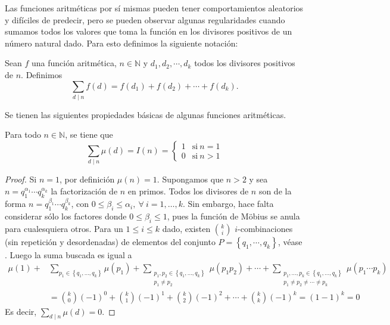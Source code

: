 Las funciones aritméticas por sí mismas pueden tener comportamientos aleatorios y difíciles de predecir, pero se pueden observar algunas regularidades cuando sumamos todos los valores que toma la función en los divisores positivos de un número natural dado. Para esto definimos la siguiente notación:

\begin{definition}
Sean $f$ una función aritmética, $n\in\mathbb{N}$ y $d_1,d_2,\cdots,d_k$ todos los divisores positivos de $n$. Definimos 
\begin{equation*}
	\sum_{d \mid n} f(d)=f(d_1)+f(d_2)+\cdots+f(d_k).
\end{equation*}
\end{definition}

Se tienen las siguientes propiedades básicas de algunas funciones aritméticas.

\begin{proposition}
Para todo $n\in\mathbb{N}$, se tiene que 
\begin{equation*}
	\sum_{d \mid n} \mu(d) = I(n) =
		\begin{cases}
			1 & \text{si} \: n=1 \\ %
			0 & \text{si} \: n>1
		\end{cases}
\end{equation*}
\end{proposition}
\begin{proof}
Si $n=1$, por definición $\mu(n)=1$. Supongamos que $n>2$ y sea $n=q_1^{\alpha_1}\cdots q_k^{\alpha_k}$ la factorización de $n$ en primos. Todos los divisores de $n$ son de la forma $n=q_1^{\beta_1}\cdots q_k^{\beta_k}$, con $0\leq \beta_i\leq \alpha_i,\:\forall \: i=1,\ldots,k$. Sin embargo, hace falta considerar sólo los factores donde $0\leq \beta_i\leq 1$, pues la función de Möbius se anula para cualesquiera otros. Para un $1\leq i\leq k$ dado, existen $\binom{k}{i}$ $i$-combinaciones (sin repetición y desordenadas) de elementos del conjunto $P=\left\{q_1,\cdots,q_k\right\}$, véase \cite{Br1-1999}. Luego la suma buscada es igual a
\begin{align*}
    \mu(1)+&\sum_{p_1\in\left\{q_1,\ldots,q_k\right\}} \mu(p_1) + \sum_{\substack{p_1,p_2\in \left\{q_1,\ldots,q_k\right\} \\ p_1\neq p_2}} \mu(p_1 p_2)+\cdots+\sum_{\substack{p_1,\ldots,p_k\in \left\{q_1,\ldots,q_k\right\} \\ p_1\neq p_2 \neq \cdots \neq p_k}} \mu(p_1\cdots p_k) \\
						   &= \binom{k}{0}(-1)^0+\binom{k}{1}(-1)^1+\binom{k}{2}(-1)^2+\cdots+\binom{k}{k}(-1)^k =  (1-1)^k=0
\end{align*}
Es decir, $\sum_{d \mid n} \mu(d)=0$.
\end{proof}

